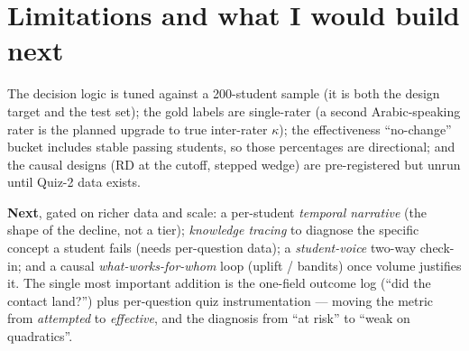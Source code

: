 \documentclass[11pt,paper=a4,parskip=half,DIV=11]{scrartcl}
\begin{document}
\section{Limitations and what I would build next}
\begin{caveat}
The decision logic is tuned against a 200-student sample (it is both the design target and the test
set); the gold labels are single-rater (a second Arabic-speaking rater is the planned upgrade to true
inter-rater \(\kappa\)); the effectiveness ``no-change'' bucket includes stable passing students, so
those percentages are directional; and the causal designs (RD at the cutoff, stepped wedge) are
pre-registered but unrun until Quiz-2 data exists.
\end{caveat}
\textbf{Next}, gated on richer data and scale: a per-student \emph{temporal narrative} (the shape of the
decline, not a tier); \emph{knowledge tracing} to diagnose the specific concept a student fails (needs
per-question data); a \emph{student-voice} two-way check-in; and a causal \emph{what-works-for-whom}
loop (uplift / bandits) once volume justifies it. The single most important addition is the one-field
outcome log (``did the contact land?'') plus per-question quiz instrumentation --- moving the metric
from \emph{attempted} to \emph{effective}, and the diagnosis from ``at risk'' to ``weak on
quadratics''.
\end{document}
